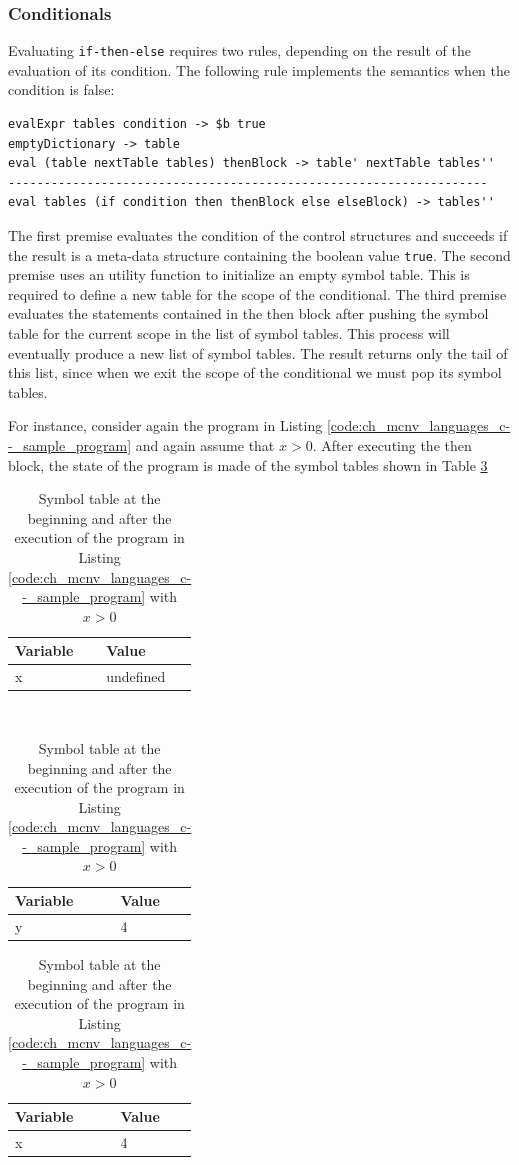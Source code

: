 \subsubsection{Conditionals}

Evaluating \texttt{if-then-else} requires two rules, depending on the result of the evaluation of its condition. The following rule implements the semantics when the condition is false:

\begin{lstlisting}
evalExpr tables condition -> $b true
emptyDictionary -> table
eval (table nextTable tables) thenBlock -> table' nextTable tables''
-------------------------------------------------------------------
eval tables (if condition then thenBlock else elseBlock) -> tables''
\end{lstlisting}

The first premise evaluates the condition of the control structures and succeeds if the result is a meta-data structure containing the boolean value \texttt{true}. The second premise uses an utility function to initialize an empty symbol table. This is required to define a new table for the scope of the conditional. The third premise evaluates the statements contained in the then block after pushing the symbol table for the current scope in the list of symbol tables. This process will eventually produce a new list of symbol tables. The result returns only the tail of this list, since when we exit the scope of the conditional we must pop its symbol tables.

For instance, consider again the program in Listing \ref{code:ch_mcnv_languages_c--_sample_program} and again assume that $x > 0$. After executing the then block, the state of the program is made of the symbol tables shown in Table \ref{tab:ch_mcnv_languages_tables_ifthenelse}

\begin{table}
	\centering
	\begin{tabular}{|l|l|}
		\hline
		\textbf{Variable} & \textbf{Value} \\
		\hline
		x & undefined\\
		\hline
	\end{tabular}\\
	\vspace{0.2cm}
	\begin{tabular}{|l|l|}
		\hline
		\textbf{Variable} & \textbf{Value} \\
		\hline
		y & 4\\
		\hline
	\end{tabular}
	\begin{tabular}{|l|l|}
		\hline
		\textbf{Variable} & \textbf{Value} \\
		\hline
		x & 4\\
		\hline
	\end{tabular}
	\caption{Symbol table at the beginning and after the execution of the program in Listing \ref{code:ch_mcnv_languages_c--_sample_program} with $x > 0$}
	\label{tab:ch_mcnv_languages_tables_ifthenelse}
\end{table}

